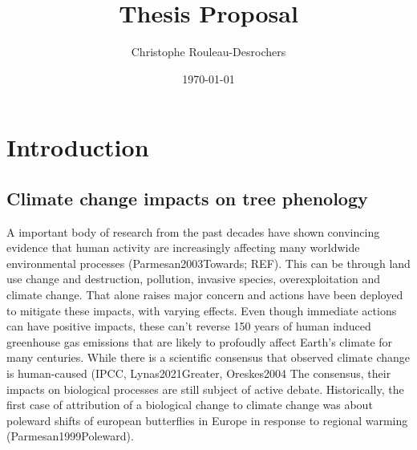 \documentclass{article}
\title{Thesis Proposal}
\date{\today}
\author{Christophe Rouleau-Desrochers}
\begin{document}

\maketitle


\section{Introduction}
\subsection{Climate change impacts on tree phenology}
A important body of research from the past decades have shown convincing evidence that human activity are increasingly affecting many worldwide environmental processes (Parmesan2003Towards; REF). This can be through land use change and destruction, pollution, invasive species, overexploitation and climate change. That alone raises major concern and actions have been deployed to mitigate these impacts, with varying effects. Even though immediate actions can have positive impacts, these can't reverse 150 years of human induced greenhouse gas emissions that are likely to profoudly affect Earth's climate for many centuries. While there is a scientific consensus that observed climate change is human-caused (IPCC, Lynas2021Greater, Oreskes2004 The consensus, their impacts on biological processes are still subject of active debate. Historically, the first case of attribution of a biological change to climate change was about poleward shifts of european butterflies in Europe in response to regional warming (Parmesan1999Poleward).

\end{document}
